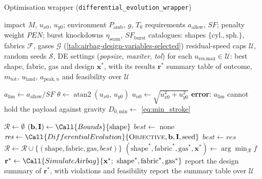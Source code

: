
\begin{algobox}[label=alg:de_wrapper]{Optimisation wrapper (\texttt{differential\_evolution\_wrapper})}
\begin{algorithmic}[1]
\Require impact $M$, $u_{x0}$, $u_{y0}$; environment $P_\text{amb}$, $g$, $T_0$
\Cont requirements $a_\text{allow}$, $\mathit{SF}$; penalty weight $\mathit{PEN}$; burst knockdowns $\eta_\text{seam}$, $\mathit{SF}_\text{burst}$
\Cont catalogues: shapes $\{\text{cyl.},\text{sph.}\}$, fabrics $\mathcal{F}$, gases $\mathcal{G}$ (\cref{tab:airbag-design-variables-selected})
\Cont residual-speed caps $\mathcal{U}$, random seeds $\mathcal{S}$, DE settings (\textit{popsize}, \textit{maxiter}, \textit{tol})
\Ensure for each $u_\text{res,max} \in \mathcal{U}$: best shape, fabric, gas and design $\mathbf{x}^*$, with its results $\mathbf{r}^*$
\Cont summary table of outcome, $m_\text{tot}$, $u_\text{land}$, $a_{\text{peak},n}$ and feasibility over $\mathcal{U}$

\State $a_\text{lim} \gets a_\text{allow}/\mathit{SF}$ 
\State $\theta \gets \operatorname{atan2}(u_{x0},\,u_{y0})$ 
\State $u_{n0} \gets \sqrt{u_{x0}^2 + u_{y0}^2}$
  \State \textbf{error}: $a_\text{lim}$ cannot hold the payload against gravity
\EndIf
\State $D_{0,\text{min}} \gets$ \cref{eq:min_stroke} 

  \State $\mathcal{R} \gets \emptyset$
    \State $(\mathbf{b}, \mathbf{I}) \gets \Call{Bounds}{\text{shape}}$ 
    \State $\mathit{best} \gets$ none
     
      \State $\mathit{res} \gets \Call{DifferentialEvolution}{\textsc{Objective}, \mathbf{b}, \mathbf{I}, \text{seed}}$ 
        \State $\mathit{best} \gets \mathit{res}$
      \EndIf
    \EndFor
    \State $\mathcal{R} \gets \mathcal{R} \cup \{(\text{shape}, \text{fabric}, \text{gas}, \mathit{best})\}$
  \EndFor
  \State $(\text{shape}^*, \text{fabric}^*, \text{gas}^*, \mathbf{x}^*) \gets \arg\min_{\mathcal{R}} f$ 
  \State $\mathbf{r}^* \gets \Call{SimulateAirbag}{\mathbf{x}^*;\ \text{shape}^*, \text{fabric}^*, \text{gas}^*}$ 
  \State report the design summary of $\mathbf{r}^*$, with violations and feasibility
\EndFor
\State report the summary table over $\mathcal{U}$
\end{algorithmic}
\end{algobox}


